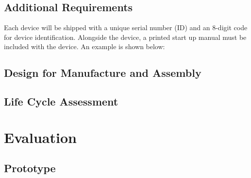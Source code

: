\documentclass{article}
\begin{document}



















\subsection{Additional Requirements}
Each device will be shipped with a unique serial number (ID) and an 8-digit code for device identification.
Alongside the device, a printed start up manual must be included with the device. An example is shown below:


\newpage

\subsection{Design for Manufacture and Assembly} \label{DMA}

\subsection{Life Cycle Assessment}


\newpage

\section{Evaluation} \label{eval}

\subsection{Prototype}



\end{document}
